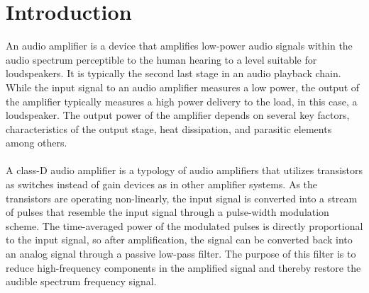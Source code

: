 \chapter{Introduction} \label{cha:introduction}
An audio amplifier is a device that amplifies low-power audio signals within the audio spectrum perceptible to the human hearing to a level suitable for loudspeakers. It is typically the second last stage in an audio playback chain. While the input signal to an audio amplifier measures a low power, the output of the amplifier typically measures a high power delivery to the load, in this case, a loudspeaker. The output power of the amplifier depends on several key factors, characteristics of the output stage, heat dissipation, and parasitic elements among others. \\\\
A class-D audio amplifier is a typology of audio amplifiers that utilizes transistors as switches instead of gain devices as in other amplifier systems. As the transistors are operating non-linearly, the input signal is converted into a stream of pulses that resemble the input signal through a pulse-width modulation scheme. The time-averaged power of the modulated pulses is directly proportional to the input signal, so after amplification, the signal can be converted back into an analog signal through a passive low-pass filter. The purpose of this filter is to reduce high-frequency components in the amplified signal and thereby restore the audible spectrum frequency signal. \\

%	

%


